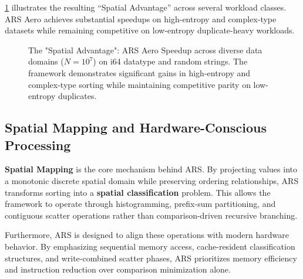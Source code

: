 \cref{fig:teaser} illustrates the resulting “Spatial Advantage” across several workload classes.
ARS Aero achieves substantial speedups on high-entropy and complex-type datasets while remaining competitive on low-entropy duplicate-heavy workloads.

\begin{figure}[t]
\centering
{}
\caption{The "Spatial Advantage": ARS Aero Speedup across diverse data domains ($N=10^7$) on i64 datatype and random strings. The framework demonstrates significant gains in high-entropy and complex-type sorting while maintaining competitive parity on low-entropy duplicates.}
\label{fig:teaser}
\end{figure}

\subsection{Spatial Mapping and Hardware-Conscious Processing}
\textbf{Spatial Mapping} is the core mechanism behind ARS.
By projecting values into a monotonic discrete spatial domain while preserving ordering relationships, ARS transforms sorting into a \textbf{spatial classification} problem. 
This allows the framework to operate through histogramming, prefix-sum partitioning, and contiguous scatter operations rather than comparison-driven recursive branching.

Furthermore, ARS is designed to align these operations with modern hardware behavior.
By emphasizing sequential memory access, cache-resident classification structures, and write-combined scatter phases, ARS prioritizes memory efficiency and instruction reduction over comparison minimization alone.

